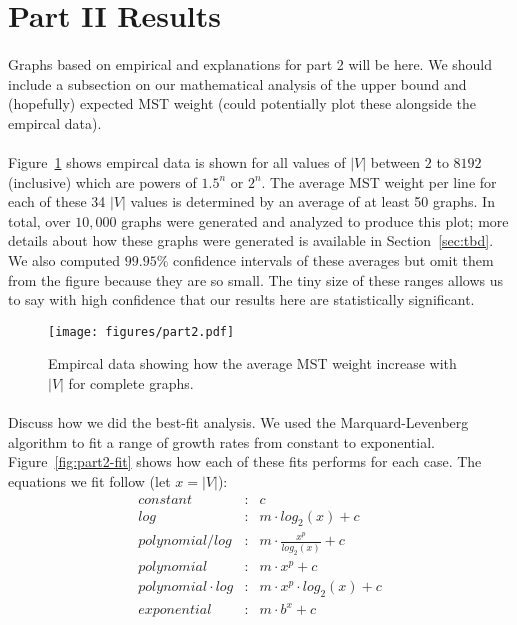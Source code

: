 \section{Part II Results}
\label{sec:part2}

\paragraph{}
Graphs based on empirical and explanations for part 2 will be here.  We should
include a subsection on our mathematical analysis of the upper bound and
(hopefully) expected MST weight (could potentially plot these alongside the
empircal data).

\paragraph{}
Figure~\ref{fig:part2} shows empircal data is shown for all values of $|V|$
between $2$ to $8192$ (inclusive) which are powers of $1.5^n$ or $2^n$.  The
average MST weight per line for each of these 34 $|V|$ values is determined by
an average of at least 50 graphs.  In total, over $10,000$ graphs were generated
and analyzed to produce this plot; more details about how these graphs were
generated is available in Section~\ref{sec:tbd}.  We also computed $99.95\%$
confidence intervals of these averages but omit them from the figure because
they are so small.  The tiny size of these ranges allows us to say with high
confidence that our results here are statistically significant.

\begin{figure}[htb!]
\centering
\texttt{[image: figures/part2.pdf]}
\caption{Empircal data showing how the average MST weight increase with $|V|$
  for complete graphs.}
\label{fig:part2}
\end{figure}

\paragraph{}
Discuss how we did the best-fit analysis.  We used the Marquard-Levenberg
algorithm to fit a range of growth rates from constant to exponential.
Figure~\ref{fig:part2-fit} shows how each of these fits performs for each case.
The equations we fit follow (let $x = |V|$):
\begin{eqnarray*}
constant&:& c \\
log&:& m \cdot log_2(x) + c \\
polynomial / log&:& m \cdot \frac{x^p}{log_2(x)} + c \\
polynomial&:& m \cdot x^p + c \\
polynomial \cdot log&:& m \cdot x^p \cdot log_2(x) + c \\
exponential&:& m \cdot b^x + c
\end{eqnarray*}

